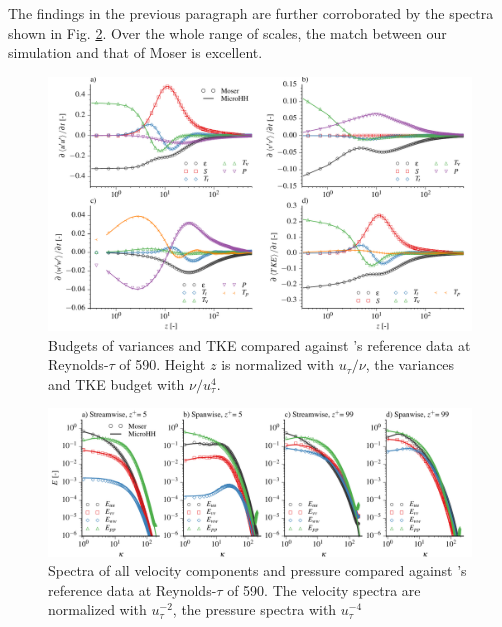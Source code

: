 \documentclass[gmd,manuscript]{copernicus}
\begin{document}
The findings in the previous paragraph are further corroborated by the spectra shown in Fig. \ref{fig:moser_spectra}.  Over the whole range of scales, the match between our simulation and that of Moser is excellent.

\begin{figure}[t]
\vspace*{2mm}
\begin{center}
\includegraphics[width=16.6cm]{figs/gmd_m590_turb_budg.pdf}
\end{center}
\caption{Budgets of variances and TKE compared against \citet{Moser1999}'s reference data at Reynolds-$\tau$ of 590. Height $z$ is normalized with $u_\tau / \nu$, the variances and TKE budget with $\nu / u_\tau^{4}$.}\label{fig:moser_budget}
\end{figure}

\begin{figure}[t]
\vspace*{2mm}
\begin{center}
\includegraphics[width=16.6cm]{figs/gmd_m590_spectra_4x1.pdf}
\end{center}
\caption{Spectra of all velocity components and pressure compared against \citet{Moser1999}'s reference data at Reynolds-$\tau$ of 590. The velocity spectra are normalized with $u_\tau^{-2}$, the pressure spectra with $u_\tau^{-4}$}\label{fig:moser_spectra}
\end{figure}
\end{document}
